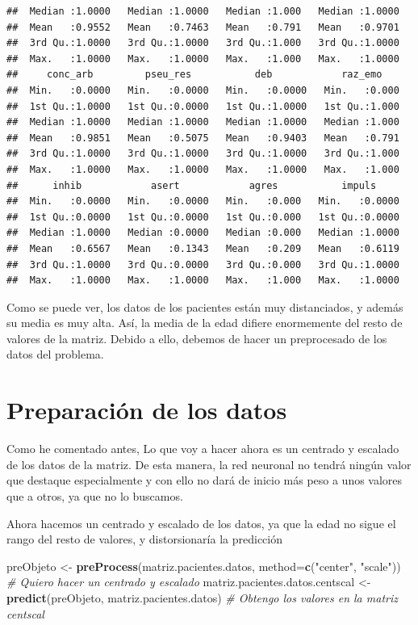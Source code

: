 \documentclass[]{article}
\newenvironment{Shaded}{\begin{snugshade}}{\end{snugshade}}
\newcommand{\KeywordTok}[1]{\textcolor[rgb]{0.13,0.29,0.53}{\textbf{#1}}}
\newcommand{\DataTypeTok}[1]{\textcolor[rgb]{0.13,0.29,0.53}{#1}}
\newcommand{\StringTok}[1]{\textcolor[rgb]{0.31,0.60,0.02}{#1}}
\newcommand{\CommentTok}[1]{\textcolor[rgb]{0.56,0.35,0.01}{\textit{#1}}}
\newcommand{\NormalTok}[1]{#1}
\begin{document}
\begin{verbatim}
##  Median :1.0000   Median :1.0000   Median :1.000   Median :1.0000  
##  Mean   :0.9552   Mean   :0.7463   Mean   :0.791   Mean   :0.9701  
##  3rd Qu.:1.0000   3rd Qu.:1.0000   3rd Qu.:1.000   3rd Qu.:1.0000  
##  Max.   :1.0000   Max.   :1.0000   Max.   :1.000   Max.   :1.0000  
##     conc_arb         pseu_res           deb            raz_emo     
##  Min.   :0.0000   Min.   :0.0000   Min.   :0.0000   Min.   :0.000  
##  1st Qu.:1.0000   1st Qu.:0.0000   1st Qu.:1.0000   1st Qu.:1.000  
##  Median :1.0000   Median :1.0000   Median :1.0000   Median :1.000  
##  Mean   :0.9851   Mean   :0.5075   Mean   :0.9403   Mean   :0.791  
##  3rd Qu.:1.0000   3rd Qu.:1.0000   3rd Qu.:1.0000   3rd Qu.:1.000  
##  Max.   :1.0000   Max.   :1.0000   Max.   :1.0000   Max.   :1.000  
##      inhib            asert            agres           impuls      
##  Min.   :0.0000   Min.   :0.0000   Min.   :0.000   Min.   :0.0000  
##  1st Qu.:0.0000   1st Qu.:0.0000   1st Qu.:0.000   1st Qu.:0.0000  
##  Median :1.0000   Median :0.0000   Median :0.000   Median :1.0000  
##  Mean   :0.6567   Mean   :0.1343   Mean   :0.209   Mean   :0.6119  
##  3rd Qu.:1.0000   3rd Qu.:0.0000   3rd Qu.:0.000   3rd Qu.:1.0000  
##  Max.   :1.0000   Max.   :1.0000   Max.   :1.000   Max.   :1.0000
\end{verbatim}

Como se puede ver, los datos de los pacientes están muy distanciados, y
además su media es muy alta. Así, la media de la edad difiere
enormemente del resto de valores de la matriz. Debido a ello, debemos de
hacer un preprocesado de los datos del problema.

\section{Preparación de los datos}\label{preparacion-de-los-datos}

Como he comentado antes, Lo que voy a hacer ahora es un centrado y
escalado de los datos de la matriz. De esta manera, la red neuronal no
tendrá ningún valor que destaque especialmente y con ello no dará de
inicio más peso a unos valores que a otros, ya que no lo buscamos.

Ahora hacemos un centrado y escalado de los datos, ya que la edad no
sigue el rango del resto de valores, y distorsionaría la predicción

\begin{Shaded}
\begin{Highlighting}[]
\NormalTok{preObjeto <-}\StringTok{ }\KeywordTok{preProcess}\NormalTok{(matriz.pacientes.datos, }\DataTypeTok{method=}\KeywordTok{c}\NormalTok{(}\StringTok{"center"}\NormalTok{, }\StringTok{"scale"}\NormalTok{))  }\CommentTok{# Quiero hacer un centrado y escalado}
\NormalTok{matriz.pacientes.datos.centscal <-}\StringTok{ }\KeywordTok{predict}\NormalTok{(preObjeto, matriz.pacientes.datos) }\CommentTok{# Obtengo los valores en la matriz centscal}
\end{Highlighting}
\end{Shaded}
\end{document}
